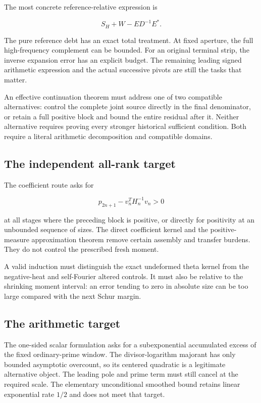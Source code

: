 \documentclass[
  10pt,
  a4paper,
  10pt,
  oneside,
  openany]{book}
\begin{document}
The most concrete reference-relative expression is

\[
 S_H+W-ED^{-1}E^*.
 \tag{49.1}\label{eq:49.1}
\]

The pure reference debt has an exact total treatment. At fixed aperture,
the full high-frequency complement can be bounded. For an original
terminal strip, the inverse expansion error has an explicit budget. The
remaining leading signed arithmetic expression and the actual successive
pivots are still the tasks that matter.

An effective continuation theorem must address one of two compatible
alternatives: control the complete joint source directly in the final
denominator, or retain a full positive block and bound the entire
residual after it. Neither alternative requires proving every stronger
historical sufficient condition. Both require a literal arithmetic
decomposition and compatible domains.

\subsection{The independent all-rank
target}\label{the-independent-all-rank-target}

The coefficient route asks for

\[
 p_{2n+1}-v_n^TH_n^{-1}v_n>0
 \tag{49.2}\label{eq:49.2}
\]

at all stages where the preceding block is positive, or directly for
positivity at an unbounded sequence of sizes. The direct coefficient
kernel and the positive-measure approximation theorem remove certain
assembly and transfer burdens. They do not control the prescribed fresh
moment.

A valid induction must distinguish the exact undeformed theta kernel
from the negative-heat and self-Fourier altered controls. It must also
be relative to the shrinking moment interval: an error tending to zero
in absolute size can be too large compared with the next Schur margin.

\subsection{The arithmetic target}\label{the-arithmetic-target}

The one-sided scalar formulation asks for a subexponential accumulated
excess of the fixed ordinary-prime window. The divisor-logarithm
majorant has only bounded asymptotic overcount, so its centered
quadratic is a legitimate alternative object. The leading pole and prime
term must still cancel at the required scale. The elementary
unconditional smoothed bound retains linear exponential rate \(1/2\) and
does not meet that target.
\end{document}
